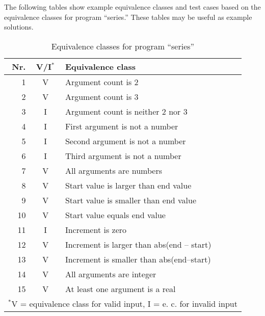 %
%

The following tables show example equivalence classes and test cases
based on the equivalence classes for program ``series.'' These tables
may be useful as example solutions. 


\begin{table}[h]
\begin{center}
\begin{tabular}{|r|c|l|}
\hline
Nr. & V/I$^*$ & Equivalence class \\
\hline
\hline
  1 &   V & Argument count is 2   \\
\hline
  2 &   V & Argument count is 3   \\
\hline
  3 &   I & Argument count is neither 2 nor 3   \\
\hline
\hline
  4 &   I & First argument is not a number \\
\hline
  5 &   I & Second argument is not a number \\
\hline
  6 &   I & Third argument is not a number \\
\hline
  7 &   V & All arguments are numbers \\
\hline
\hline
  8 &   V & Start value is larger than end value \\
\hline
  9 &   V & Start value is smaller than end value \\
\hline
 10 &   V & Start value equals end value \\
\hline
\hline
 11 &   I & Increment is zero \\
\hline
 12 &   V & Increment is larger than abs(end -- start) \\
\hline
 13 &   V & Increment is smaller than abs(end--start) \\
\hline
\hline
 14 &   V & All arguments are integer \\
\hline
 15 &   V & At least one argument is a real\\
\hline
\multicolumn{3}{l}{$^*$V = equivalence class for valid input, 
I = e. c. for invalid input}
\end{tabular}
\end{center}
\caption{Equivalence classes for program ``series''}
\label{T:equiv-classes-series}
\end{table}

